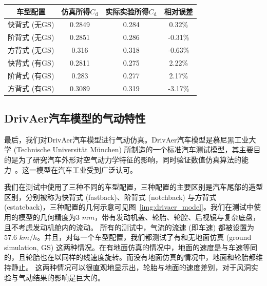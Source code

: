 \begin{table}[!htbp]
    \centering
  \begin{tabular}{*{4}{c}}
        \toprule
    车型配置 & 仿真所得$C_\text{d}$ & 实际实验所得$C_\text{d}$ & 相对误差 \\
        \midrule
    快背式 (无GS) & 0.2849 & 0.284 & 0.32\%\\
    阶背式 (无GS) & 0.2851 & 0.286 & -0.31\%\\
    方背式 (无GS) & 0.316 & 0.318 & -0.63\%\\
    快背式 (有GS) & 0.2811 & 0.275 & 2.22\%\\				
    阶背式 (有GS) & 0.283 & 0.277 & 2.17\%\\				
    方背式 (有GS) & 0.3089 & 0.319  & -3.17\%\\
        \bottomrule
  \end{tabular}
  \label{tab:drivaer_result}
\end{table}

\subsection{DrivAer汽车模型的气动特性}
最后，我们对DrivAer汽车模型进行气动仿真。DrivAer汽车模型是慕尼黑工业大学 (Technische Universit\"at M\"unchen) 所制造的一个标准汽车测试模型，其主要目的是为了研究汽车外形对空气动力学特征的影响，同时验证数值仿真算法的能力~\citep{Heft-2011, Heft-2012}。这一模型在汽车工业受到广泛认可。

我们在测试中使用了三种不同的车型配置，三种配置的主要区别是汽车尾部的造型区别，分别被称为快背式 (fastback)、阶背式 (notchback) 与方背式 (estateback)，三种配置的几何示意可见图~\ref{img:drivaer_model}。我们在测试中使用的模型的几何精度为3 $mm$，带有发动机盖、轮胎、轮腔、后视镜与复杂底盘，且不考虑发动机舱内的流动。
所有的测试中，气流的流速 (即车速) 都被设置为57.6 $km/h$。并且，对每一个车型配置，我们都测试了有和无地面仿真 (ground simulation, GS) 这两种情况。在有地面仿真的情况中，地面的速度是与车速等同的，且轮胎也在以同样的线速度旋转。而没有地面仿真的情况中，地面和轮胎都维持静止。
这两种情况可以很直观地显示出，轮胎与地面的速度差别，对于风洞实验与气动结果的影响是巨大的。

